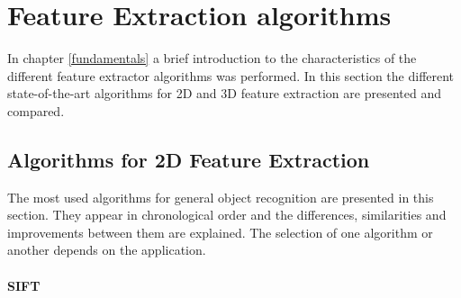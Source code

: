 







\section{Feature Extraction algorithms}
In chapter \ref{fundamentals} a brief introduction to the characteristics of the different feature extractor algorithms was performed. 
In this section the different state-of-the-art algorithms for 2D and 3D feature extraction are presented and compared. 

\subsection{Algorithms for 2D Feature Extraction}
\label{2d_features}


The most used algorithms for general object recognition are presented in this section. 
They appear in chronological order and the differences, similarities and improvements between them are explained. 
The selection of one algorithm or another depends on the application.


\paragraph{SIFT}\mbox{}\\
\label{sift}

